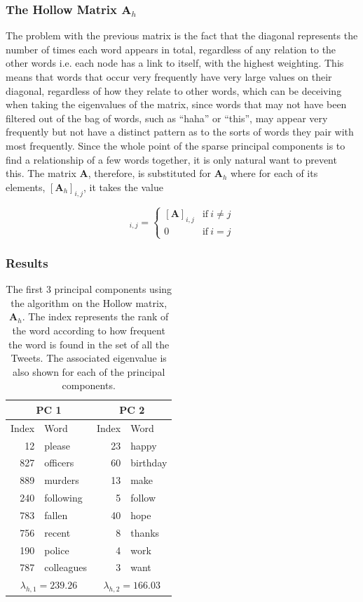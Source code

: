 \documentclass[11pt,a4paper]{article}
\begin{document}
  
\subsubsection{The Hollow Matrix $\mathbf{A}_{h}$}

The problem with the previous matrix is the fact that the diagonal represents the number of times each word appears in total, regardless of any relation to the other words i.e. each node has a link to itself, with the highest weighting. This means that words that occur very frequently have very large values on their diagonal, regardless of how they relate to other words, which can be deceiving when taking the eigenvalues of the matrix, since words that may not have been filtered out of the bag of words, such as ``haha'' or ``this'', may appear very frequently but not have a distinct pattern as to the sorts of words they pair with most frequently. Since the whole point of the sparse principal components is to find a relationship of a few words together, it is only natural want to prevent this. The matrix $\mathbf{A}$, therefore,  is substituted for 
$\mathbf{A}_h$ where for each of its elements, $[\mathbf{A}_h]_{i, j}$, it takes the value 

\begin{equation}
[\mathbf{A}_h]_{i, j}= 
\begin{cases}
[\mathbf{A}]_{i, j} & \text{if}\ i \neq j\\
0 & \text{if}\ i = j
\end{cases}
\end{equation}

\subsubsection*{Results}
\begin{table}[H]
\center
\begin{tabular}{| r| l | r| l |}
\hline
\multicolumn{2}{|c|}{PC 1} & \multicolumn{2}{|c|}{PC 2}\\
\hline
Index & Word & Index & Word\\
\hline
12 & please & 23 & happy \\
827 & officers & 60 & birthday \\
889 & murders & 13 & make \\
240 & following & 5 & follow\\
783 & fallen & 40 & hope\\
756 & recent & 8 & thanks\\ 
190 & police & 4 & work\\
787 & colleagues & 3 & want\\
\hline
\multicolumn{2}{|c|}{ $\lambda_{h, 1} = 239.26$}  & \multicolumn{2}{|c|}{ $\lambda_{h, 2} = 166.03$}  \\
\hline
\end{tabular}
\caption{The first 3 principal components using the algorithm on the Hollow matrix, $ \mathbf{A}_h$. The index represents the rank of the word according to how frequent the word is found in the set of all the Tweets. The associated eigenvalue is also shown for each of the principal components.}
\end{table}
\end{document}
